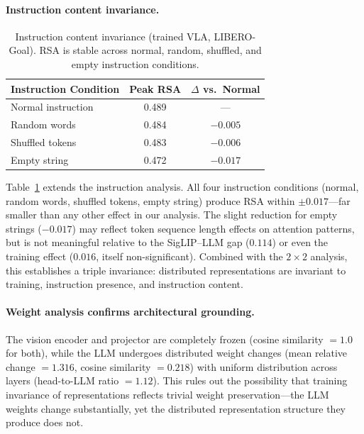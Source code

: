 \documentclass[letterpaper]{article}
\begin{document}
\paragraph{Instruction content invariance.}

\begin{table}[t]
\centering
\caption{Instruction content invariance (trained VLA, LIBERO-Goal). RSA is stable across normal, random, shuffled, and empty instruction conditions.}
\label{tab:instruction}
\begin{tabular}{lcc}
\toprule
\textbf{Instruction Condition} & \textbf{Peak RSA} & \textbf{$\Delta$ vs.\ Normal} \\
\midrule
Normal instruction  & 0.489 & --- \\
Random words        & 0.484 & $-0.005$ \\
Shuffled tokens     & 0.483 & $-0.006$ \\
Empty string        & 0.472 & $-0.017$ \\
\bottomrule
\end{tabular}
\end{table}

Table~\ref{tab:instruction} extends the instruction analysis.
All four instruction conditions (normal, random words, shuffled tokens, empty string) produce RSA within $\pm 0.017$---far smaller than any other effect in our analysis.
The slight reduction for empty strings ($-0.017$) may reflect token sequence length effects on attention patterns, but is not meaningful relative to the SigLIP--LLM gap ($0.114$) or even the training effect ($0.016$, itself non-significant).
Combined with the $2{\times}2$ analysis, this establishes a triple invariance: distributed representations are invariant to training, instruction presence, and instruction content.

\paragraph{Weight analysis confirms architectural grounding.}
The vision encoder and projector are completely frozen (cosine similarity $= 1.0$ for both), while the LLM undergoes distributed weight changes (mean relative change $= 1.316$, cosine similarity $= 0.218$) with uniform distribution across layers (head-to-LLM ratio $= 1.12$).
This rules out the possibility that training invariance of representations reflects trivial weight preservation---the LLM weights change substantially, yet the distributed representation structure they produce does not.
\end{document}

